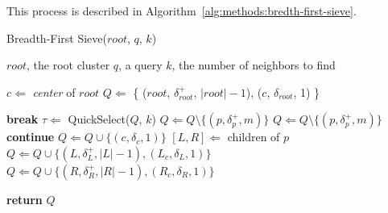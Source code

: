 This process is described in Algorithm~\ref{alg:methods:bredth-first-sieve}.

\begin{minipage}{0.46\textwidth}
\begin{algorithm}[H] %
    \caption{Breadth-First Sieve($root$, $q$, $k$)} %
    \label{alg:methods:bredth-first-sieve} %
    \begin{tiny}
    \begin{algorithmic}[0] %
        \Require $root$, the root cluster
        \Require $q$, a query
        \Require $k$, the number of neighbors to find

        \State $c \Leftarrow$ \textit{center} of $root$
        \State $Q \Leftarrow$ \{ ($root$, $\delta^{+}_{root}$, $|root| - 1$), ($c$, $\delta_{root}$, 1) \}

        \Loop
                \State \textbf{break}
            \EndIf
            \State $\tau \Leftarrow$ QuickSelect($Q$, $k$)
                    \State $Q \Leftarrow Q \setminus \{ (p, \delta^{+}_{p}, m) \}$
                \EndIf
            \EndFor
                \State $Q \Leftarrow Q \setminus \{ (p, \delta^{+}_{p}, m) \}$
                    \State \textbf{continue}
                        \State $Q \Leftarrow Q \cup \{ (c, \delta_{c}, 1) \}$
                    \EndFor
                \Else
                    \State $[L, R] \Leftarrow$ children of $p$
                    \State $Q \Leftarrow Q \cup \{ (L, \delta^{+}_{L}, |L| - 1), (L_c, \delta_{L}, 1) \}$
                    \State $Q \Leftarrow Q \cup \{ (R, \delta^{+}_{R}, |R| - 1), (R_c, \delta_{R}, 1) \}$
                \EndIf
            \EndFor
        \EndLoop

        \State \textbf{return} $Q$
    \end{algorithmic}
    \end{tiny}
\end{algorithm}
\end{minipage}
\hfill
